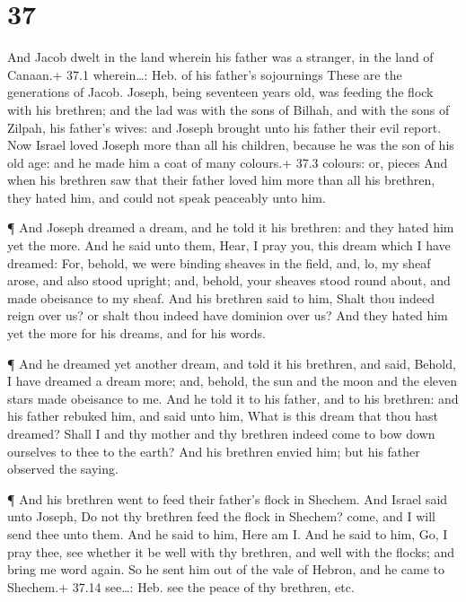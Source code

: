 \hypertarget{section-36}{%
\section{37}\label{section-36}}

 And Jacob dwelt in the land wherein his father was a
stranger, in the land of Canaan.+ 37.1 wherein\ldots: Heb. of his
father's sojournings  These are the generations of Jacob.
Joseph, being seventeen years old, was feeding the flock with his
brethren; and the lad was with the sons of Bilhah, and with the sons of
Zilpah, his father's wives: and Joseph brought unto his father their
evil report.  Now Israel loved Joseph more than all his
children, because he was the son of his old age: and he made him a coat
of many colours.+ 37.3 colours: or, pieces  And when his
brethren saw that their father loved him more than all his brethren,
they hated him, and could not speak peaceably unto him.

 ¶ And Joseph dreamed a dream, and he told it his brethren:
and they hated him yet the more.  And he said unto them,
Hear, I pray you, this dream which I have dreamed:  For,
behold, we were binding sheaves in the field, and, lo, my sheaf arose,
and also stood upright; and, behold, your sheaves stood round about, and
made obeisance to my sheaf.  And his brethren said to him,
Shalt thou indeed reign over us? or shalt thou indeed have dominion over
us? And they hated him yet the more for his dreams, and for his words.

 ¶ And he dreamed yet another dream, and told it his
brethren, and said, Behold, I have dreamed a dream more; and, behold,
the sun and the moon and the eleven stars made obeisance to me.
 And he told it to his father, and to his brethren: and his
father rebuked him, and said unto him, What is this dream that thou hast
dreamed? Shall I and thy mother and thy brethren indeed come to bow down
ourselves to thee to the earth?  And his brethren envied
him; but his father observed the saying.

 ¶ And his brethren went to feed their father's flock in
Shechem.  And Israel said unto Joseph, Do not thy brethren
feed the flock in Shechem? come, and I will send thee unto them. And he
said to him, Here am I.  And he said to him, Go, I pray
thee, see whether it be well with thy brethren, and well with the
flocks; and bring me word again. So he sent him out of the vale of
Hebron, and he came to Shechem.+ 37.14 see\ldots: Heb. see the peace of
thy brethren, etc.

